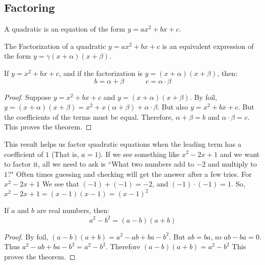 \documentclass[../main.tex]{subfiles}
\begin{document}
\subsection{Factoring}
%
\begin{definition}
A quadratic is an equation of the form $y=ax^2+bx+c$.
\end{definition}
%
\begin{definition}
The Factorization of a quadratic $y=ax^2+bx+c$ is an equivalent expression of the form $y=\gamma(x+\alpha)(x+\beta)$.
\end{definition}
%
\begin{theorem}
\label{theorem:north_shore_factorization_of_quadratic_when_a_is_equal_to_zero}
If $y=x^2+bx+c$, and if the factorization is $y=(x+\alpha)(x+\beta)$, then:
\begin{equation*}
    b = \alpha + \beta
    \quad \quad \quad
    c = \alpha \cdot \beta
\end{equation*}
\end{theorem}
\begin{proof}
Suppose $y = x^2 + bx + c$ and $y = (x+\alpha)(x+\beta)$. By \gls{foil}, $y = (x+\alpha)(x+\beta) = x^2 +x(\alpha + \beta) + \alpha \cdot \beta$. But also $y=x^2 + bx + c$. But the coefficients of the terms must be equal. Therefore, $\alpha + \beta = b$ and $\alpha \cdot \beta = c$. This proves the theorem.
\end{proof}
%
\begin{remark}\label{remark:north_shore_example_of_using_factorization_when_a_equals_zero}
This result helps us factor quadratic equations when the leading term has a coefficient of $1$ (That is, $a=1$). If we see something like $x^2-2x + 1$ and we want to factor it, all we need to ask is ``What two numbers add to $-2$ and multiply to $1$?" Often times guessing and checking will get the answer after a few tries. For $x^2-2x+1$ We see that $(-1)+(-1) = -2$, and $(-1)\cdot (-1) = 1$. So, $x^2 - 2x +1 = (x-1)(x-1) = (x-1)^2$
\end{remark}
%
\begin{theorem}
\label{theorem:north_shore_difference_of_squares}
If $a$ and $b$ are real numbers, then:
\begin{equation*}
    a^2 - b^2 = (a-b)(a+b)
\end{equation*}
\end{theorem}
\begin{proof}
By \gls{foil}, $(a-b)(a+b) = a^2 - ab + ba - b^2$. But $ab = ba$, so $ab-ba = 0$. Thus $a^2 - ab + ba - b^2 = a^2 - b^2$. Therefore $(a-b)(a+b) = a^2-b^2$ This proves the theorem.
\end{proof}
\end{document}
